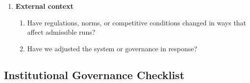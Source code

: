 \begin{enumerate}
\begin{enumerate}
          \item Are frontline users reporting concerns or workarounds?
          \item Have we incorporated their tacit knowledge back into
                design updates?
        \end{enumerate}
  \item \textbf{External context}
        \begin{enumerate}
          \item Have regulations, norms, or competitive conditions
                changed in ways that affect admissible runs?
          \item Have we adjusted the system or governance in response?
        \end{enumerate}
\end{enumerate}

\subsection{Institutional Governance Checklist}

